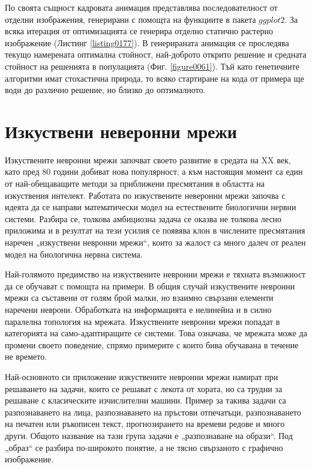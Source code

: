 По своята същност кадровата анимация представлява последователност от отделни изображения, генерирани с помощта на функциите в пакета $ggplot2$. За всяка итерация от оптимизацията се генерира отделно статично растерно изображение (Листинг \ref{listing0177}). В генерираната анимация се проследява текущо намерената оптимална стойност, най-доброто открито решение и средната стойност на решенията в популацията (Фиг. \ref{figure0061}). Тъй като генетичните алгоритми имат стохастична природа, то всяко стартиране на кода от примера ще води до различно решение, но близко до оптималното. 

\section{Изкуствени неверонни мрежи}

Изкуствените невронни мрежи започват своето развитие в средата на XX век, като пред 80 години добиват нова популярност, а към настоящия момент са един от най-обещаващите методи за приближени пресмятания в областта на изкуствения интелект. Работата по изкуствените неверонни мрежи започва с идеята да се направи математически модел на естествените биологични нервни системи. Разбира се, толкова амбициозна задача се оказва не толкова лесно приложима и в резултат на тези усилия се появява клон в числените пресмятания наречен „изкуствени невронни мрежи“, които за жалост са много далеч от реален модел на биологична нервна система. 

Най-голямото предимство на изкуствените невронни мрежи е тяхната възможност да се обучават с помощта на примери. В общия случай изкуствените невронни мрежи са съставени от голям брой малки, но взаимно свързани елементи наречени неврони. Обработката на информацията е нелинейна и в силно паралелна топология на мрежата. Изкуствените невронни мрежи попадат в категорията на само-адаптиращите се системи. Това означава, че мрежата може да промени своето поведение, спрямо примерите с които бива обучавана в течение не времето. 

Най-основното си приложение изкуствените невронни мрежи намират при решаването на задачи, които се решават с лекота от хората, но са трудни за решаване с класическите изчислителни машини. Пример за такива задачи са разпознаването на лица, разпознаването на пръстови отпечатъци, разпознаването на печатен или ръкописен текст, прогнозирането на времеви редове и много други. Общото название на тази група задачи е „разпознаване на образи“. Под „образ“ се разбира по-широкото понятие, а не тясно свързаното с графично изображение. 

